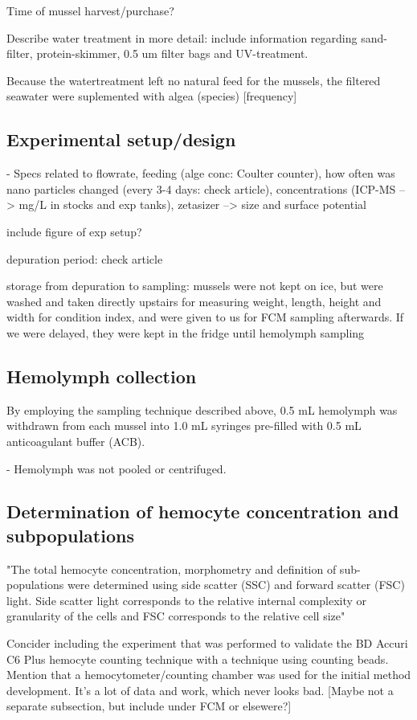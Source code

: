 Time of mussel harvest/purchase?

Describe water treatment in more detail: include information regarding sand-filter, protein-skimmer, 0.5 um filter bags and UV-treatment.

Because the watertreatment left no natural feed for the mussels, the filtered seawater were suplemented with algea (species) [frequency]


\subsection{Experimental setup/design}
- Specs related to flowrate, feeding (alge conc: Coulter counter), how often was nano particles changed (every 3-4 days: check article), concentrations (ICP-MS --> mg/L in stocks and exp tanks), zetasizer --> size and surface potential

include figure of exp setup?

depuration period: check article

storage from depuration to sampling: mussels were not kept on ice, but were washed and taken directly upstairs for measuring weight, length, height and width for condition index, and were given to us for FCM sampling afterwards. If we were delayed, they were kept in the fridge until hemolymph sampling 


\subsection{Hemolymph collection}
By employing the sampling technique described above, 0.5 mL hemolymph was withdrawn from each mussel into 1.0 mL syringes pre-filled with 0.5 mL anticoagulant buffer (ACB).

- Hemolymph was not pooled or centrifuged. 

\subsection{Determination of hemocyte concentration and subpopulations}
"The total hemocyte concentration, morphometry and definition of sub-populations were determined using side scatter (SSC) and forward scatter (FSC) light. Side scatter light corresponds to the relative internal complexity or granularity of the cells and FSC corresponds to the relative cell size" \cite{Rolton2020}


Concider including the experiment that was performed to validate the BD Accuri C6 Plus hemocyte counting technique with a technique using counting beads. Mention that a hemocytometer/counting chamber was used for the initial method development. It's a lot of data and work, which never looks bad. [Maybe not a separate subsection, but include under FCM or elsewere?]

